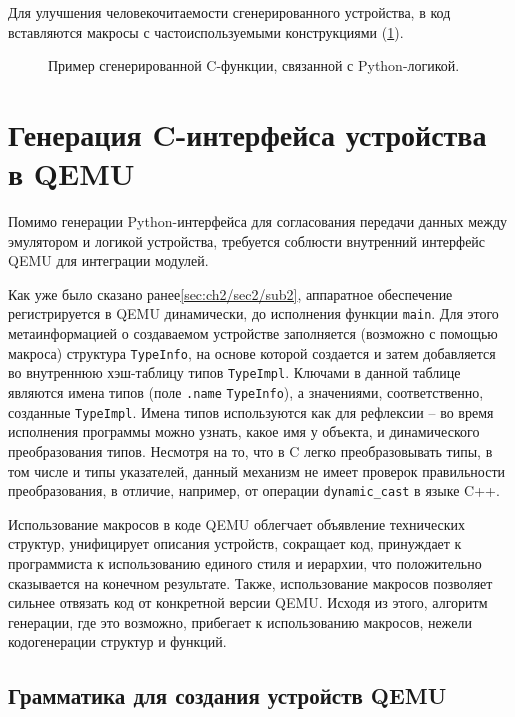 Для улучшения человекочитаемости сгенерированного устройства, в код вставляются макросы с
частоиспользуемыми конструкциями (\cref{fig:py-api-func-compilation}).

\begin{figure}[!htbp]
    \centering
    \begin{adjustwidth*}{-1cm}{}
        
    \end{adjustwidth*}
    \caption{Пример сгенерированной C-функции, связанной с Python-логикой.}\label{fig:py-api-func-compilation}
\end{figure}

\section{Генерация C-интерфейса устройства в QEMU}\label{sec:ch2/sec2/sub4}

Помимо генерации Python-интерфейса для согласования передачи данных между эмулятором
и логикой устройства, требуется соблюсти внутренний интерфейс QEMU для интеграции
модулей.

Как уже было сказано ранее\cref{sec:ch2/sec2/sub2}, аппаратное обеспечение регистрируется
в QEMU динамически, до исполнения функции \texttt{main}.
Для этого метаинформацией о создаваемом устройстве заполняется (возможно с помощью макроса)
структура \texttt{TypeInfo}, на основе которой создается и затем добавляется во внутреннюю
хэш-таблицу типов \texttt{TypeImpl}. Ключами в данной таблице являются имена типов
(поле \texttt{.name} \texttt{TypeInfo}), а значениями, соответственно, созданные \texttt{TypeImpl}.
Имена типов используются как для рефлексии -- во время исполнения программы можно узнать,
какое имя у объекта, и динамического преобразования типов.
Несмотря на то, что в C легко преобразовывать типы, в том числе и типы указателей, данный
механизм не имеет проверок правильности преобразования, в отличие, например, от
операции \texttt{dynamic\_cast} в языке C++.

Использование макросов в коде QEMU облегчает объявление технических структур,
унифицирует описания устройств, сокращает код, принуждает к программиста к использованию
единого стиля и иерархии, что положительно сказывается на конечном результате.
Также, использование макросов позволяет сильнее отвязать код от конкретной версии
QEMU.
Исходя из этого, алгоритм генерации, где это возможно, прибегает к использованию макросов,
нежели кодогенерации структур и функций.

\subsection{Грамматика {\mylanguage} для создания устройств QEMU}\label{sec:ch2/sec2/sub4/sub1}

